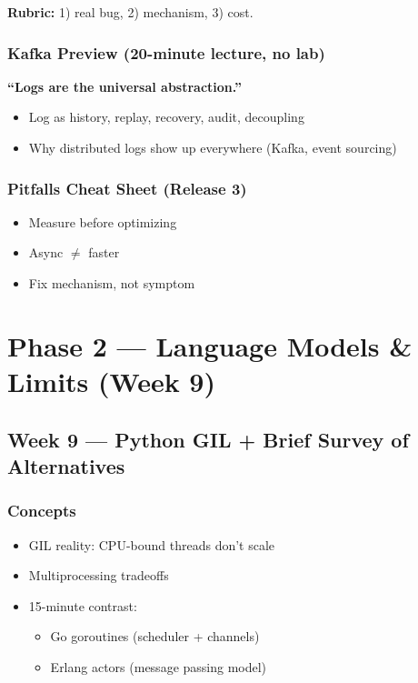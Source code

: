 \documentclass[11pt,a4paper]{article}
\begin{document}
	\textbf{Rubric:} 1) real bug, 2) mechanism, 3) cost.
	
	\subsubsection*{Kafka Preview (20-minute lecture, no lab)}
	\textbf{``Logs are the universal abstraction.''}
	\begin{itemize}[leftmargin=*]
		\item Log as history, replay, recovery, audit, decoupling
		\item Why distributed logs show up everywhere (Kafka, event sourcing)
	\end{itemize}
	
	\subsubsection*{Pitfalls Cheat Sheet (Release 3)}
	\begin{itemize}[leftmargin=*]
		\item Measure before optimizing
		\item Async $\neq$ faster
		\item Fix mechanism, not symptom
	\end{itemize}
	
	\section*{Phase 2 --- Language Models \& Limits (Week 9)}
	
	\subsection*{Week 9 --- Python GIL + Brief Survey of Alternatives}
	
	\subsubsection*{Concepts}
	\begin{itemize}[leftmargin=*]
		\item GIL reality: CPU-bound threads don't scale
		\item Multiprocessing tradeoffs
		\item 15-minute contrast:
		\begin{itemize}[leftmargin=*]
			\item Go goroutines (scheduler + channels)
			\item Erlang actors (message passing model)
		\end{itemize}
	\end{itemize}
	
\end{document}
